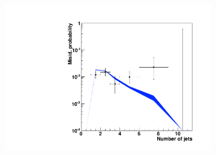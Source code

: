 \begin{figure}
\begin{subfigure}[b]{0.33\textwidth}
                \includegraphics[width=\textwidth]{4_Analisys/pics/8TeV/plots/fakerates/m_mmt_leading_kNN_numJets20.pdf}
                \caption{}
        \end{subfigure}


\end{figure}
